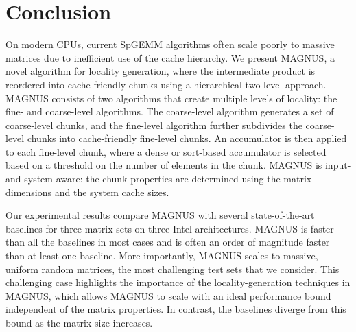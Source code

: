 \section{Conclusion}
On modern CPUs, 
current SpGEMM algorithms often scale poorly to massive
matrices due to inefficient use of the cache hierarchy.
We present MAGNUS, a novel algorithm for locality generation, where
the intermediate product is reordered into cache-friendly chunks using a hierarchical two-level approach.
MAGNUS consists of two algorithms that create multiple levels of locality: the fine- and coarse-level algorithms.
The coarse-level algorithm generates a set of coarse-level chunks, and the fine-level algorithm further subdivides the coarse-level chunks into cache-friendly fine-level chunks.
An accumulator is then applied to each fine-level chunk, where a dense or sort-based accumulator is selected based on a threshold on the number of elements in the chunk.
MAGNUS is input- and system-aware: the chunk properties are determined using the matrix dimensions and the system cache sizes.

Our experimental results compare MAGNUS with several state-of-the-art baselines for three matrix sets on three Intel architectures.
MAGNUS is faster than all the baselines in most cases and is often an order of magnitude faster than at least one baseline.
More importantly, MAGNUS scales to massive, uniform random matrices, the most challenging test sets that we consider.
This challenging case highlights the importance of the locality-generation techniques in MAGNUS, which allows MAGNUS to scale with an ideal performance bound independent of the matrix properties.  In contrast, the baselines diverge from this bound as the matrix size increases.
